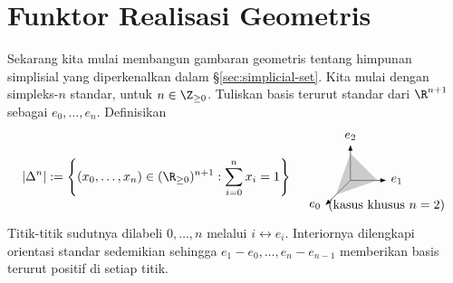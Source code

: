 
\section{Funktor Realisasi Geometris}\label{sec:geom-realization}
\hypertarget{o014.aljabr2.chapter8.geometric-realization}{ }
Sekarang kita mulai membangun gambaran geometris tentang himpunan simplisial yang
diperkenalkan dalam \S\ref{sec:simplicial-set}. Kita mulai dengan simpleks-$n$
standar, untuk $n\in\Z_{\geq0}$. Tuliskan basis terurut standar dari
$\R^{n+1}$ sebagai $e_0,\ldots,e_n$. Definisikan
\[
|\Delta^n| := \left\{ (x_0, \ldots, x_n) \in (\R_{\geq 0})^{n+1} : \sum_{i=0}^n x_i = 1 \right\} \quad
\begin{tikzpicture}[baseline=(O)]
	\coordinate (O) at (0, 0);
	\draw[-Latex] (0, 0) -- (-0.7, -0.7) node[left] {$e_0$};
	\draw[-Latex] (0, 0) -- (1, 0) node[right] {$e_1$};
	\draw[-Latex] (0, 0) -- (0, 1) node [above] {$e_2$};
	\fill[color=gray, opacity=0.4] (-0.4, -0.4) -- (0.75, 0) -- (0, 0.75) --cycle;
	\node at (1, -0.7) {(kasus khusus $n=2$)};
\end{tikzpicture}
\]
Titik-titik sudutnya dilabeli $0,\ldots,n$ melalui $i\leftrightarrow e_i$.
Interiornya dilengkapi orientasi standar sedemikian sehingga
$e_1-e_0,\ldots,e_n-e_{n-1}$ memberikan basis terurut positif di setiap
titik.

